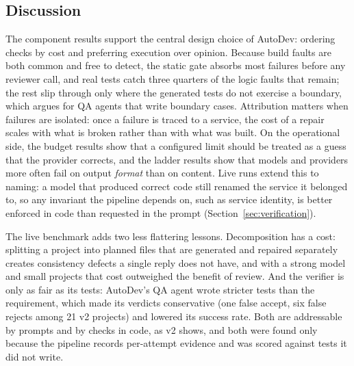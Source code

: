 \documentclass[conference,letterpaper]{IEEEtran}
\begin{document}
\subsection{Discussion}
The component results support the central design choice of AutoDev: ordering
checks by cost and preferring execution over opinion. Because build faults are
both common and free to detect, the static gate absorbs most failures before any
reviewer call, and real tests catch three quarters of the logic faults that
remain; the rest slip through only where the generated tests do not exercise a
boundary, which argues for QA agents that write boundary cases. Attribution
matters when failures are isolated: once a failure is traced to a service, the
cost of a repair scales with what is broken rather than with what was built. On
the operational side, the budget results show that a configured limit should be
treated as a guess that the provider corrects, and the ladder results show that
models and providers more often fail on output \emph{format} than on content.
Live runs extend this to naming: a model that produced correct code still renamed
the service it belonged to, so any invariant the pipeline depends on, such as
service identity, is better enforced in code than requested in the prompt
(Section~\ref{sec:verification}).

The live benchmark adds two less flattering lessons. Decomposition has a cost:
splitting a project into planned files that are generated and repaired
separately creates consistency defects a single reply does not have, and with a
strong model and small projects that cost outweighed the benefit of review. And
the verifier is only as fair as its tests: AutoDev's QA agent wrote stricter tests
than the requirement, which made its verdicts conservative (one false accept, six
false rejects among 21 v2 projects) and lowered its success rate. Both are
addressable by prompts and by checks in code, as v2 shows, and both were found
only because the pipeline records per-attempt evidence and was scored against
tests it did not write.
\end{document}
